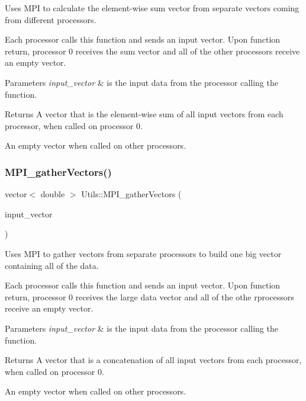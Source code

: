 Uses M\+PI to calculate the element-\/wise sum vector from separate vectors coming from different processors. 

Each processor calls this function and sends an input vector. Upon function return, processor 0 receives the sum vector and all of the other processors receive an empty vector. 
\begin{DoxyParams}{Parameters}
{\em input\+\_\+vector} & is the input data from the processor calling the function. \\
\hline
\end{DoxyParams}
\begin{DoxyReturn}{Returns}
A vector that is the element-\/wise sum of all input vectors from each processor, when called on processor 0. 

An empty vector when called on other processors. 
\end{DoxyReturn}
\mbox{\label{namespace_utils_af9a7e13279f18cd8d36ca98a7943a7e8}} 
\subsubsection{\texorpdfstring{M\+P\+I\+\_\+gather\+Vectors()}{MPI\_gatherVectors()}}
{\footnotesize\ttfamily vector$<$ double $>$ Utils\+::\+M\+P\+I\+\_\+gather\+Vectors (\begin{DoxyParamCaption}\item[{const vector$<$ double $>$ \&}]{input\+\_\+vector }\end{DoxyParamCaption})}



Uses M\+PI to gather vectors from separate processors to build one big vector containing all of the data. 

Each processor calls this function and sends an input vector. Upon function return, processor 0 receives the large data vector and all of the othe rprocessors receive an empty vector. 
\begin{DoxyParams}{Parameters}
{\em input\+\_\+vector} & is the input data from the processor calling the function. \\
\hline
\end{DoxyParams}
\begin{DoxyReturn}{Returns}
A vector that is a concatenation of all input vectors from each processor, when called on processor 0. 

An empty vector when called on other processors. 
\end{DoxyReturn}
\mbox{\label{namespace_utils_ae6b61a9030cf09d8cba2566a42c871df}} 
